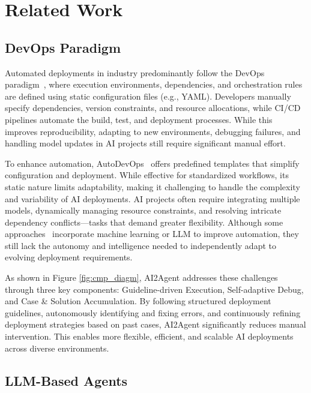 \section{Related Work}

\subsection{DevOps Paradigm}
Automated deployments in industry predominantly follow the DevOps paradigm~\cite{bass2015devops,ebert2016devops}, where execution environments, dependencies, and orchestration rules are defined using static configuration files (e.g., YAML). Developers manually specify dependencies, version constraints, and resource allocations, while CI/CD pipelines automate the build, test, and deployment processes. While this improves reproducibility, adapting to new environments, debugging failures, and handling model updates in AI projects still require significant manual effort.

To enhance automation, AutoDevOps~\cite{AutoDevops} offers predefined templates that simplify configuration and deployment. While effective for standardized workflows, its static nature limits adaptability, making it challenging to handle the complexity and variability of AI deployments. AI projects often require integrating multiple models, dynamically managing resource constraints, and resolving intricate dependency conflicts—tasks that demand greater flexibility. Although some approaches~\cite{battina2019intelligentdevops,karamitsos2020applyingdevops,bou2024enhancingdevops,enemosah2025enhancingdevops} incorporate machine learning or LLM to improve automation, they still lack the autonomy and intelligence needed to independently adapt to evolving deployment requirements.

As shown in Figure \ref{fig:cmp_diagm}, AI2Agent addresses these challenges through three key components: Guideline-driven Execution, Self-adaptive Debug, and Case \& Solution Accumulation. By following structured deployment guidelines, autonomously identifying and fixing errors, and continuously refining deployment strategies based on past cases, AI2Agent significantly reduces manual intervention. This enables more flexible, efficient, and scalable AI deployments across diverse environments.

\subsection{LLM-Based Agents}

